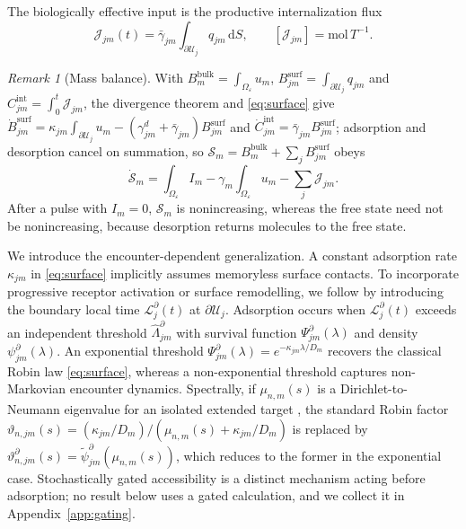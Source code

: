 \documentclass[pdflatex,sn-mathphys-num]{sn-jnl}
\numberwithin{equation}{section}
\theoremstyle{thmstyleone}%
\theoremstyle{definition}
\theoremstyle{remark}
\newtheorem{remark}[theorem]{Remark}
\newcommand{\dd}{\,\mathrm{d}}
\begin{document}
The biologically effective input is the productive internalization flux
\begin{equation*}
\mathcal J_{jm}(t)=\bar\gamma_{jm}\int_{\partial\mathcal U_j}q_{jm}\dd S,
\qquad[\mathcal J_{jm}]=\mathrm{mol}\,T^{-1}.
\end{equation*}

\begin{remark}[Mass balance]\label{rem:mass}
With $B_m^{\mathrm{bulk}}=\int_{\Omega_\varepsilon}u_m$, $B_{jm}^{\mathrm{surf}}=\int_{\partial\mathcal U_j}q_{jm}$ and $C_{jm}^{\mathrm{int}}=\int_0^t\mathcal J_{jm}$, the divergence theorem and \eqref{eq:surface} give $\dot B_{jm}^{\mathrm{surf}}=\kappa_{jm}\int_{\partial\mathcal U_j}u_m-(\gamma^d_{jm}+\bar\gamma_{jm})B_{jm}^{\mathrm{surf}}$ and $\dot C_{jm}^{\mathrm{int}}=\bar\gamma_{jm}B_{jm}^{\mathrm{surf}}$; adsorption and desorption cancel on summation, so $\mathcal S_m=B_m^{\mathrm{bulk}}+\sum_jB_{jm}^{\mathrm{surf}}$ obeys 
\begin{equation}
\dot{\mathcal S}_m=\int_{\Omega_\varepsilon}I_m-\gamma_m\!\int_{\Omega_\varepsilon}\!u_m-\sum_j\mathcal J_{jm}.
\label{eq:massbal}
\end{equation}
After a pulse with $I_m=0$, $\mathcal S_m$ is nonincreasing, whereas the free state need not be nonincreasing, because desorption returns molecules to the free state. 
\end{remark}

We introduce the encounter-dependent generalization.
A constant adsorption rate $\kappa_{jm}$ in \eqref{eq:surface} implicitly assumes memoryless surface contacts. To incorporate progressive receptor activation or surface remodelling, we follow \cite{bressloff2025diffusion,yu2026beyond} by introducing the boundary local time $\mathcal L^\partial_j(t)$ at $\partial\mathcal U_j$. Adsorption occurs when $\mathcal L^\partial_j(t)$ exceeds an independent threshold $\widehat\Lambda^\partial_{jm}$ with survival function $\Psi^\partial_{jm}(\lambda)$ and density $\psi^\partial_{jm}(\lambda)$. An exponential threshold $\Psi^\partial_{jm}(\lambda)=e^{-\kappa_{jm}\lambda/D_m}$ recovers the classical Robin law \eqref{eq:surface}, whereas a non-exponential threshold captures non-Markovian encounter dynamics. Spectrally, if $\mu_{n,m}(s)$ is a Dirichlet-to-Neumann eigenvalue for an isolated extended target \cite{bressloff2022spectral,yu2026microscopic}, the standard Robin factor $\vartheta_{n,jm}(s)=(\kappa_{jm}/D_m)/(\mu_{n,m}(s)+\kappa_{jm}/D_m)$ is replaced by $\vartheta^\partial_{n,jm}(s)=\widetilde\psi^\partial_{jm}(\mu_{n,m}(s))$, which reduces to the former in the exponential case. Stochastically gated accessibility is a distinct mechanism acting before adsorption; no result below uses a gated calculation, and we collect it in Appendix~\ref{app:gating}.
\end{document}
